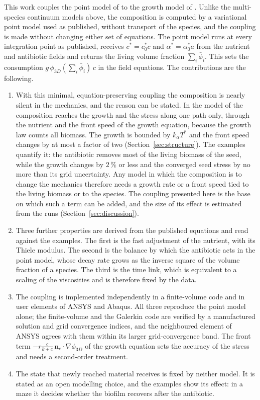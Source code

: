 \documentclass[11pt,a4paper]{article}
\newcommand{\phiD}{\phi_{3D}}
\newcommand{\lv}{\textstyle\sum_i\bar\phi_i}
\newcommand{\nc}{\mathbf n_c}
\newcommand{\fterm}{\ensuremath{-r\tfrac{c}{k+c}\,\nc\cdot\nabla\phiD}}
\begin{document}
This work couples the point model of \citet{Klempt2026ContinuumBacterialGrowth} to the growth model of \citet{Klempt2024DiffusionDrivenGrowth}. Unlike the multi-species continuum models above, the composition is computed by a variational point model used as published, without transport of the species, and the coupling is made without changing either set of equations. The point model runs at every integration point as published, receives $c^*=c^*_0c$ and $\alpha^*=\alpha^*_0a$ from the nutrient and antibiotic fields and returns the living volume fraction $\lv$. This sets the consumption $g\,\phiD(\lv)\,c$ in the field equations. The contributions are the following.
\begin{enumerate}
\item With this minimal, equation-preserving coupling the composition is nearly silent in the mechanics, and the reason can be stated. In the model of \citet{Klempt2024DiffusionDrivenGrowth} the composition reaches the growth and the stress along one path only, through the nutrient and the front speed of the growth equation, because the growth law counts all biomass. The growth is bounded by $k_\alpha T^*$ and the front speed changes by at most a factor of two (Section~\ref{sec:structure}). The examples quantify it: the antibiotic removes most of the living biomass of the seed, while the growth changes by $2\,\%$ or less and the converged seed stress by no more than its grid uncertainty. Any model in which the composition is to change the mechanics therefore needs a growth rate or a front speed tied to the living biomass or to the species. The coupling presented here is the base on which such a term can be added, and the size of its effect is estimated from the runs (Section~\ref{sec:discussion}).
\item Three further properties are derived from the published equations and read against the examples. The first is the fast adjustment of the nutrient, with its Thiele modulus. The second is the balance by which the antibiotic acts in the point model, whose decay rate grows as the inverse square of the volume fraction of a species. The third is the time link, which is equivalent to a scaling of the viscosities and is therefore fixed by the data.
\item The coupling is implemented independently in a finite-volume code and in user elements of ANSYS and Abaqus. All three reproduce the point model alone; the finite-volume and the Galerkin code are verified by a manufactured solution and grid convergence indices, and the neighboured element of ANSYS agrees with them within its larger grid-convergence band. The front term \fterm{} of the growth equation sets the accuracy of the stress and needs a second-order treatment.
\item The state that newly reached material receives is fixed by neither model. It is stated as an open modelling choice, and the examples show its effect: in a maze it decides whether the biofilm recovers after the antibiotic.
\end{enumerate}
\end{document}
